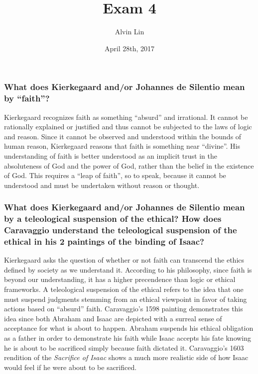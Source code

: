 \documentclass[letterpaper, 12pt]{article}
\title{Exam 4}
\author{Alvin Lin}
\date{April 28th, 2017}
\begin{document}
\maketitle

\subsubsection*{What does Kierkegaard and/or Johannes de Silentio mean by ``faith''?}
Kierkegaard recognizes faith as something ``absurd'' and irrational. It cannot be rationally explained or justified and thus cannot be subjected to the laws of logic and reason. Since it cannot be observed and understood within the bounds of human reason, Kierkegaard reasons that faith is something near ``divine''. His understanding of faith is better understood as an implicit trust in the absoluteness of God and the power of God, rather than the belief in the existence of God. This requires a ``leap of faith'', so to speak, because it cannot be understood and must be undertaken without reason or thought.

\subsubsection*{What does Kierkegaard and/or Johannes de Silentio mean by a teleological suspension of the ethical? How does Caravaggio understand the teleological suspension of the ethical in his 2 paintings of the binding of Isaac?}
Kierkegaard asks the question of whether or not faith can transcend the ethics defined by society as we understand it. According to his philosophy, since faith is beyond our understanding, it has a higher precendence than logic or ethical frameworks. A teleological suspension of the ethical refers to the idea that one must suspend judgments stemming from an ethical viewpoint in favor of taking actions based on ``absurd'' faith. Caravaggio's 1598 painting demonstrates this idea since both Abraham and Isaac are depicted with a surreal sense of acceptance for what is about to happen. Abraham suspends his ethical obligation as a father in order to demonstrate his faith while Isaac accepts his fate knowing he is about to be sacrificed simply because faith dictated it. Caravaggio's 1603 rendition of the \textit{Sacrifice of Isaac} shows a much more realistic side of how Isaac would feel if he were about to be sacrificed.
\end{document}

